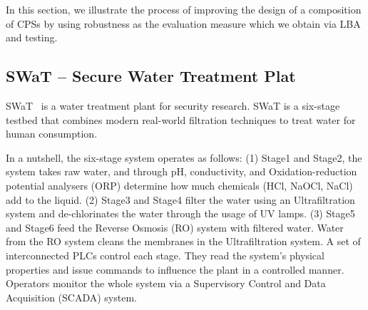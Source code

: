 {%
In this section, we illustrate the process of improving the design of a composition of CPSs by using robustness as the evaluation measure which we obtain via LBA and testing.
\subsection{SWaT -- Secure Water Treatment Plat}
SWaT~\cite{SWat}
is a water treatment plant for security research. SWaT is a six-stage testbed that combines modern real-world filtration techniques to treat water for human consumption.

In a nutshell, the six-stage system operates as follows:
(1) Stage1 and Stage2, the system takes raw water, and through pH, conductivity, and Oxidation-reduction potential analysers (ORP) determine how much chemicals (HCl, NaOCl, NaCl) add to the liquid. 
(2) Stage3 and Stage4 filter the water using an Ultrafiltration system and de-chlorinates the water through the usage of UV lamps. 
(3) Stage5 and Stage6 feed the Reverse Osmosis (RO) system with filtered water. Water from the RO system cleans the membranes in the Ultrafiltration system. 
A set of interconnected PLCs control each stage. 
They read the system's physical properties and issue commands to influence the plant in a controlled manner. 
Operators monitor the whole system via a Supervisory Control and Data Acquisition (SCADA) system.

}
